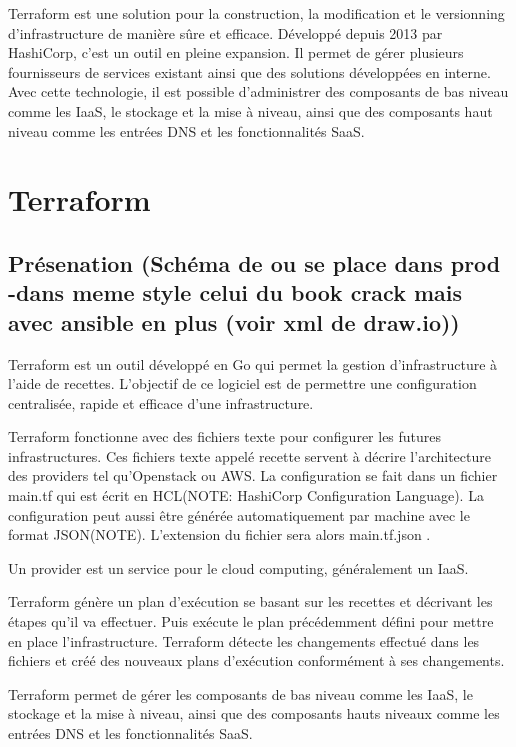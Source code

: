 \documentclass[]{article}
\begin{document}
Terraform est une solution pour la construction, la modification et le
versionning d'infrastructure de manière sûre et efficace. Développé
depuis 2013 par HashiCorp, c'est un outil en pleine expansion. Il permet
de gérer plusieurs fournisseurs de services existant ainsi que des
solutions développées en interne. Avec cette technologie, il est
possible d'administrer des composants de bas niveau comme les IaaS, le
stockage et la mise à niveau, ainsi que des composants haut niveau comme
les entrées DNS et les fonctionnalités SaaS.

\section{Terraform}\label{terraform}

\subsection{Présenation (Schéma de ou se place dans prod -dans meme
style celui du book crack mais avec ansible en plus (voir xml de
draw.io))}\label{pruxe9senation-schuxe9ma-de-ou-se-place-dans-prod--dans-meme-style-celui-du-book-crack-mais-avec-ansible-en-plus-voir-xml-de-draw.io}

Terraform est un outil développé en Go qui permet la gestion
d'infrastructure à l'aide de recettes. L'objectif de ce logiciel est de
permettre une configuration centralisée, rapide et efficace d'une
infrastructure.

Terraform fonctionne avec des fichiers texte pour configurer les futures
infrastructures. Ces fichiers texte appelé \og recette \fg servent à
décrire l'architecture des providers tel qu'Openstack ou AWS. La
configuration se fait dans un fichier \og main.tf \fg qui est écrit en
HCL(NOTE: HashiCorp Configuration Language). La configuration peut aussi
être générée automatiquement par machine avec le format JSON(NOTE).
L'extension du fichier sera alors \og main.tf.json \fg.

Un provider est un service pour le cloud computing, généralement un
IaaS.

Terraform génère un plan d'exécution se basant sur les recettes et
décrivant les étapes qu'il va effectuer. Puis exécute le plan
précédemment défini pour mettre en place l'infrastructure. Terraform
détecte les changements effectué dans les fichiers et créé des nouveaux
plans d'exécution conformément à ses changements.

Terraform permet de gérer les composants de bas niveau comme les IaaS,
le stockage et la mise à niveau, ainsi que des composants hauts niveaux
comme les entrées DNS et les fonctionnalités SaaS.
\end{document}
